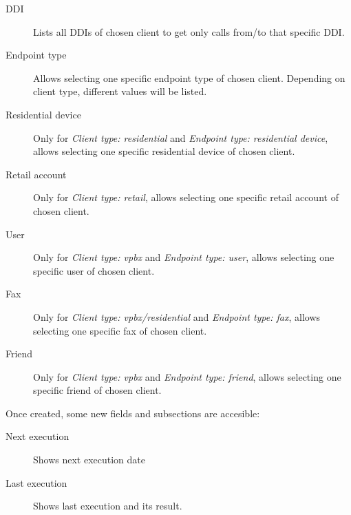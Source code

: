 \documentclass[letterpaper,10pt,english]{sphinxmanual}
\begin{document}
\begin{description}
\item[{DDI}] \leavevmode{}\label{administration_portal/brand/calls/call_csv_schedulers:term-ddi}
Lists all DDIs of chosen client to get only calls from/to that specific DDI.

\item[{Endpoint type}] \leavevmode{}\label{administration_portal/brand/calls/call_csv_schedulers:term-endpoint-type}
Allows selecting one specific endpoint type of chosen client. Depending on client type, different values will
be listed.

\item[{Residential device}] \leavevmode{}\label{administration_portal/brand/calls/call_csv_schedulers:term-residential-device}
Only for \emph{Client type: residential} and \emph{Endpoint type: residential device}, allows selecting one specific residential device of chosen client.

\item[{Retail account}] \leavevmode{}\label{administration_portal/brand/calls/call_csv_schedulers:term-retail-account}
Only for \emph{Client type: retail}, allows selecting one specific retail account of chosen client.

\item[{User}] \leavevmode{}\label{administration_portal/brand/calls/call_csv_schedulers:term-user}
Only for \emph{Client type: vpbx} and \emph{Endpoint type: user}, allows selecting one specific user of chosen client.

\item[{Fax}] \leavevmode{}\label{administration_portal/brand/calls/call_csv_schedulers:term-fax}
Only for \emph{Client type: vpbx/residential} and \emph{Endpoint type: fax}, allows selecting one specific fax of chosen client.

\item[{Friend}] \leavevmode{}\label{administration_portal/brand/calls/call_csv_schedulers:term-friend}
Only for \emph{Client type: vpbx} and \emph{Endpoint type: friend}, allows selecting one specific friend of chosen client.

\end{description}

Once created, some new fields and subsections are accesible:
\begin{description}
\item[{Next execution}] \leavevmode{}\label{administration_portal/brand/calls/call_csv_schedulers:term-next-execution}
Shows next execution date

\item[{Last execution}] \leavevmode{}\label{administration_portal/brand/calls/call_csv_schedulers:term-last-execution}
Shows last execution and its result.

\end{description}
\end{document}
